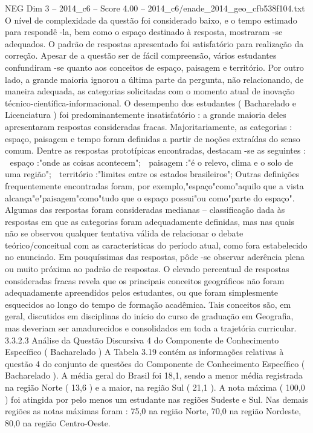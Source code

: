 \begin{textsample}{NEG Dim 3 – 2014\_c6 – Score 4.00 – 2014\_c6/enade\_2014\_geo\_cfb538f104.txt}
O nível de complexidade da questão foi considerado baixo, e o tempo estimado para respondê -la, bem como o espaço destinado à resposta, mostraram -se adequados.
O padrão de respostas apresentado foi satisfatório para realização da correção.
Apesar de a questão ser de fácil compreensão, vários estudantes confundiram -se quanto aos conceitos de espaço, paisagem e território.
Por outro lado, a grande maioria ignorou a última parte da pergunta, não relacionando, de maneira adequada, as categorias solicitadas com o momento atual de inovação técnico-científica-informacional.
O desempenho dos estudantes ( Bacharelado e Licenciatura ) foi predominantemente insatisfatório : a grande maioria deles apresentaram respostas consideradas fracas.
Majoritariamente, as categorias : espaço, paisagem e tempo foram definidas a partir de noções extraídas do senso comum.
Dentre as respostas prototípicas encontradas, destacam -se as seguintes :  espaço :"onde as coisas acontecem";  paisagem :"é o relevo, clima e o solo de uma região";  território :"limites entre os estados brasileiros"; Outras definições frequentemente encontradas foram, por exemplo,"espaço"como"aquilo que a vista alcança"e"paisagem"como"tudo que o espaço possui"ou como"parte do espaço".
Algumas das respostas foram consideradas medianas – classificação dada às respostas em que as categorias foram adequadamente definidas, mas nas quais não se observou qualquer tentativa válida de relacionar o debate teórico/conceitual com as características do período atual, como fora estabelecido no enunciado.
Em pouquíssimas das respostas, pôde -se observar aderência plena ou muito próxima ao padrão de respostas.
O elevado percentual de respostas consideradas fracas revela que os principais conceitos geográficos não foram adequadamente apreendidos pelos estudantes, ou que foram simplesmente esquecidos ao longo do tempo de formação acadêmica.
Tais conceitos são, em geral, discutidos em disciplinas do início do curso de graduação em Geografia, mas deveriam ser amadurecidos e consolidados em toda a trajetória curricular. 3.3.2.3 Análise da Questão Discursiva 4 do Componente de Conhecimento Específico ( Bacharelado ) A Tabela 3.19 contém as informações relativas à questão 4 do conjunto de questões do Componente de Conhecimento Específico ( Bacharelado ).
A média geral do Brasil foi 18,1, sendo a menor média registrada na região Norte ( 13,6 ) e a maior, na região Sul ( 21,1 ).
A nota máxima ( 100,0 ) foi atingida por pelo menos um estudante nas regiões Sudeste e Sul.
Nas demais regiões as notas máximas foram : 75,0 na região Norte, 70,0 na região Nordeste, 80,0 na região Centro-Oeste.

\end{textsample}
